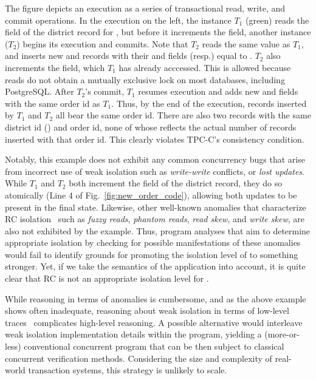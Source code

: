 The figure depicts an execution as a series of transactional read, write, and commit
operations. In the execution on the left, the  instance
$T_1$ (green) reads the  field of the district
record for , but before it increments the field, another
 instance ($T_2$) begins its execution and commits. Note
that $T_2$ reads the same  value as $T_1$, and
inserts new  and  records with their 
and  fields (resp.) equal to . $T_2$
also increments the  field, which $T_1$ has already
acccessed. This is allowed because reads do not obtain a mutually
exclusive lock on most databases, including PostgreSQL. After $T_2$'s
commit, $T_1$ resumes execution and adds new  and
 fields with the same order id as $T_1$. Thus, by the
end of the execution,  records inserted by $T_1$ and
$T_2$ all bear the same order id. There are also two  records
with the same district id () and order id, none of whose
 reflects the actual number of  records
inserted with that order id.  This clearly violates TPC-C's consistency
condition.

Notably, this example does not exhibit any common concurrency bugs
that arise from incorrect use of weak isolation such as
\emph{write-write} conflicts, or \emph{lost updates}.  While $T_1$ and
$T_2$ both increment the  field of the district
record, they do so atomically (Line 4 of
Fig.~\ref{fig:new_order_code}), allowing both updates to be present in
the final state. Likewise, other well-known anomalies that
characterize RC isolation~\cite{berenson} such as \emph{fuzzy reads},
\emph{phantom reads}, \emph{read skew}, and \emph{write skew}, are
also not exhibited by the example.  Thus, program analyses that aim to
determine appropriate isolation by checking for possible
manifestations of these anomalies would fail to identify grounds for
promoting the isolation level of  to something stronger.
Yet, if we take the semantics of the application into account, it is
quite clear that RC is not an appropriate isolation level for
.

While reasoning in terms of anomalies is cumbersome, and as the above
example shows often inadequate, reasoning about weak isolation in
terms of low-level traces~\cite{adyaphd,gotsmanconcur15} complicates
high-level reasoning.  A possible alternative would interleave weak
isolation implementation details within the program, yielding a
(more-or-less) conventional concurrent program that can be then
subject to classical concurrent verification methods.  Considering the
size and complexity of real-world transaction systems, this strategy
is unlikely to scale.

